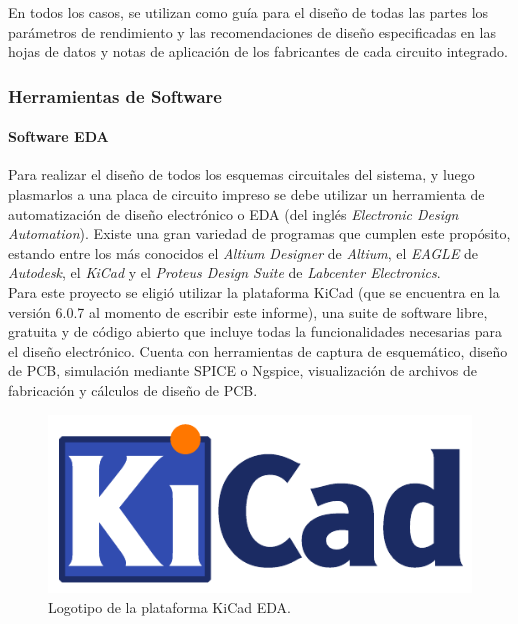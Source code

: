 En todos los casos, se utilizan como guía para el diseño de todas las partes los parámetros de rendimiento y las recomendaciones de diseño especificadas en las hojas de datos  y notas de aplicación de los fabricantes de cada circuito integrado.\\

\subsubsection{Herramientas de Software}

\paragraph{Software EDA}

Para realizar el diseño de todos los esquemas circuitales del sistema, y luego plasmarlos a una placa de circuito impreso se debe utilizar un herramienta de automatización de diseño electrónico o EDA (del inglés \textit{Electronic Design Automation}). Existe una gran variedad de programas que cumplen este propósito, estando entre los más conocidos el \textit{Altium Designer} de \textit{Altium}, el \textit{EAGLE} de \textit{Autodesk}, el \textit{KiCad} y el \textit{Proteus Design Suite} de \textit{Labcenter Electronics}.\\

Para este proyecto se eligió utilizar la plataforma {\Medium KiCad} (que se encuentra en la versión 6.0.7 al momento de escribir este informe), una suite de software libre, gratuita y de código abierto que incluye todas la funcionalidades necesarias para el diseño electrónico. Cuenta con herramientas de captura de esquemático, diseño de PCB, simulación mediante SPICE o Ngspice, visualización de archivos de fabricación y cálculos de diseño de PCB.\\

\begin{figure}[h]
    \centering
    \includegraphics[scale=0.6]{Imagenes/KiCad.pdf}
    \caption{Logotipo de la plataforma KiCad EDA.}
    \label{logo_kicad}
\end{figure}

